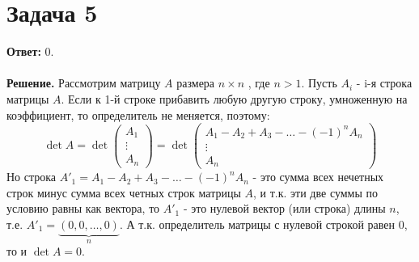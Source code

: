 \documentclass{article}
\begin{document}
\section*{Задача 5}
{\bf Ответ:} 0.
\\
\\
{\bf Решение.} Рассмотрим матрицу $A$ размера $n\times n$ , где  $n > 1$.  Пусть $A_i$ - i-я строка матрицы $A$. Если к 1-й строке прибавить любую другую строку, умноженную на коэффициент, то определитель не меняется, поэтому:
$$\det A = \det\left(\begin{array}{c}A_1 \\ \vdots \\ A_n\end{array}\right)=\det\left(\begin{array}{c}A_1 - A_2 + A_3 - \ldots - (-1)^n A_n\\ \vdots \\ A_n\end{array}\right)$$
Но строка $A'_1 = A_1 - A_2 + A_3 - \ldots - (-1)^n A_n$ - это сумма всех нечетных строк минус сумма всех четных строк матрицы $A$, и т.к. эти две суммы по условию равны как вектора, то $A'_1$ - это нулевой вектор (или строка) длины $n$, т.е. $A'_1 = \underbrace{(0, 0, \dots, 0)}_{n}$. А т.к. определитель матрицы с нулевой строкой равен 0, то и $\det A = 0$.
\\
\end{document}
